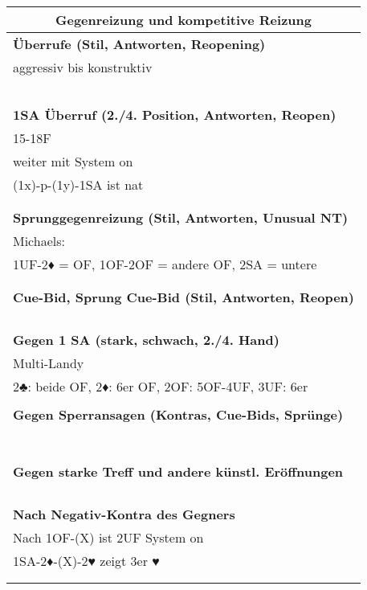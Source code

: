 \documentclass{article}
\begin{document}
\begin{multicols}{3}
\raggedcolumns

\begin{tabularx}{\columnwidth}{|X|}
\hline \multicolumn{1}{c}{\bf \large Gegenreizung und kompetitive Reizung} \\
\hline \bf Überrufe (Stil, Antworten, Reopening) \\
 aggressiv bis konstruktiv \\
\\
\\
\\
\\
\\
\hline \bf 1SA Überruf (2./4. Position, Antworten, Reopen) \\
 15-18F \\
 weiter mit System on \\
 (1x)-p-(1y)-1SA ist nat \\
\\
\\
\hline \bf Sprunggegenreizung (Stil, Antworten, Unusual NT) \\
 Michaels: \\
 1UF-2♦ = OF, 1OF-2OF = andere OF, 2SA = untere \\
\\
\\
\hline \bf Cue-Bid, Sprung Cue-Bid (Stil, Antworten, Reopen) \\
\\
\\
\\
\\
\hline \bf Gegen 1 SA (stark, schwach, 2./4. Hand) \\
 Multi-Landy \\
 2♣: beide OF, 2♦: 6er OF, 2OF: 5OF-4UF, 3UF: 6er \\
\\
\hline \bf Gegen Sperransagen (Kontras, Cue-Bids, Sprünge) \\
\\
\\
\\
\\
\\
\\
\\
\hline \bf Gegen starke Treff und andere künstl. Eröffnungen \\
\\
\\
\\
\\
\hline \bf Nach Negativ-Kontra des Gegners \\
 Nach 1OF-(X) ist 2UF System on \\
 1SA-2♦-(X)-2♥ zeigt 3er ♥ \\
\\
\\
\hline \end{tabularx}


\end{multicols}
\end{document}
